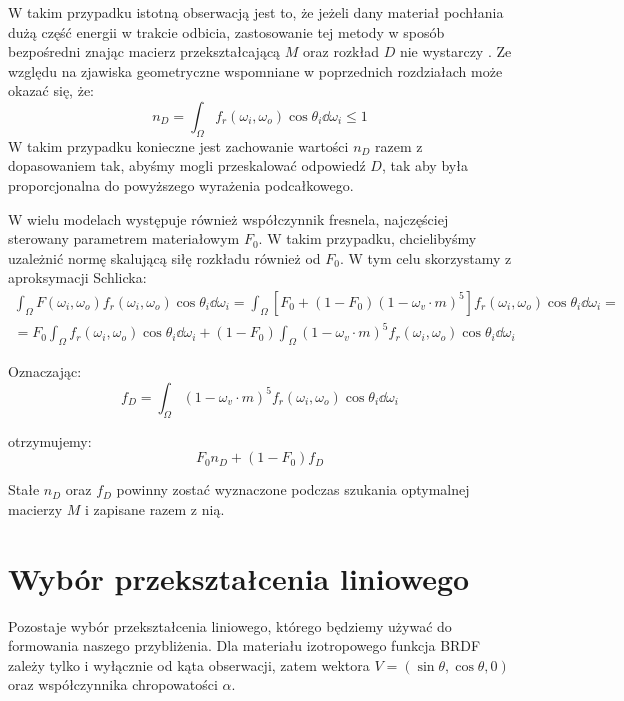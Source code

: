 \documentclass[../main.tex]{subfiles}
\begin{document}
W takim przypadku istotną obserwacją jest to, że jeżeli dany materiał pochłania dużą część energii w trakcie odbicia, zastosowanie tej metody w sposób bezpośredni znając macierz przekształcającą $M$ oraz rozkład $D$ nie wystarczy \cite{LTCFresnelApprox}. Ze względu na zjawiska geometryczne wspomniane w poprzednich rozdziałach może okazać się, że:
\[
    n_D = \int_{\Omega} {
        f_r(\omega_i, \omega_o) \cos\theta_i 
        \dd \omega_i
    } \leq 1
\]
W takim przypadku konieczne jest zachowanie wartości $n_D$ razem z dopasowaniem tak, abyśmy mogli przeskalować odpowiedź $D$, tak aby była proporcjonalna do powyższego wyrażenia podcałkowego.

W wielu modelach występuje również współczynnik fresnela, najczęściej sterowany parametrem materiałowym $F_0$. W takim przypadku, chcielibyśmy uzależnić normę skalującą siłę rozkładu również od $F_0$. W tym celu skorzystamy z aproksymacji Schlicka:
\begin{gather*}
\int_{\Omega} {
    F(\omega_i, \omega_o)
    f_r(\omega_i, \omega_o) 
    \cos\theta_i 
    \dd \omega_i
} =
\int_{\Omega} {
    \left[
        F_0 + (1-F_0)(1 - \omega_v \cdot m)^5
    \right]
    f_r(\omega_i, \omega_o) 
    \cos\theta_i 
    \dd \omega_i
} = \\
= F_0 \int_{\Omega} {
    f_r(\omega_i, \omega_o) 
    \cos\theta_i 
    \dd \omega_i
} + (1-F_0) \int_{\Omega} {
    (1 - \omega_v \cdot m)^5
    f_r(\omega_i, \omega_o) 
    \cos\theta_i 
    \dd \omega_i
}
\end{gather*}

Oznaczając:
\[
    f_D = \int_{\Omega} {
        (1 - \omega_v \cdot m)^5
        f_r(\omega_i, \omega_o) 
        \cos\theta_i 
        \dd \omega_i
    }
\]

\noindent otrzymujemy:
\[
    F_0 n_D + (1-F_0) f_D
\]

Stałe $n_D$ oraz $f_D$ powinny zostać wyznaczone podczas szukania optymalnej macierzy $M$ i zapisane razem z nią.


\section{Wybór przekształcenia liniowego}

Pozostaje wybór przekształcenia liniowego, którego będziemy używać do formowania naszego przybliżenia. Dla materiału izotropowego funkcja BRDF zależy tylko i wyłącznie od kąta obserwacji, zatem wektora $V = (\sin\theta, \cos\theta, 0)$ oraz współczynnika chropowatości $\alpha$.
\end{document}
